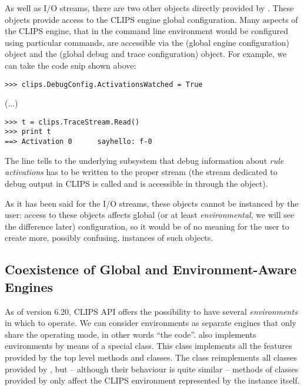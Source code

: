As well as I/O streams, there are two other objects directly provided
by \pyclips{}. These objects provide access to the CLIPS engine global
configuration. Many aspects of the CLIPS engine, that in the command
line environment would be configured using particular commands, are
accessible via the  (global engine configuration)
object and the  (global debug and trace configuration)
object. For example, we can take the code snip shown above:

\begin{verbatim}
>>> clips.DebugConfig.ActivationsWatched = True
\end{verbatim}
(...)
\begin{verbatim}
>>> t = clips.TraceStream.Read()
>>> print t
==> Activation 0      sayhello: f-0
\end{verbatim}

The  line tells to the
underlying subsystem that debug information about \emph{rule activations}
has to be written to the proper stream (the stream dedicated to debug
output in CLIPS is called  and is accessible in \pyclips{}
through the  object).

As it has been said for the I/O streams, these objects cannot be instanced
by the user: access to these objects affects global (or at least
\emph{environmental}, we will see the difference later) configuration,
so it would be of no meaning for the user to create more, possibly
confusing, instances of such objects.


\subsection{Coexistence of Global and Environment-Aware Engines\label{pyclips-ov-env}}

As of version 6.20, CLIPS API offers the possibility to have several
\emph{environments} in which to operate. We can consider environments as
separate engines that only share the operating mode, in other words
``the code''. \pyclips{} also implements environments by means of a special
 class. This class implements all the features
provided by the top level methods and classes. The 
class reimplements all classes provided by \pyclips{}, but -- although
their behaviour is quite similar -- methods of classes provided by
 only affect the CLIPS environment represented by the
 instance itself.

